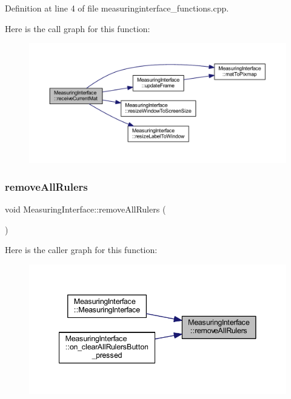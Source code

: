 Definition at line 4 of file measuringinterface\+\_\+functions.\+cpp.

Here is the call graph for this function\+:
\nopagebreak
\begin{figure}[H]
\begin{center}
\leavevmode
\includegraphics[width=350pt]{classMeasuringInterface_a776a6aa345a738ee46e84c272fd35ce7_cgraph}
\end{center}
\end{figure}
\mbox{\label{classMeasuringInterface_afc88c0d8a1a77e188aa000e2efb1cc80}} 
\subsubsection{\texorpdfstring{removeAllRulers}{removeAllRulers}}
{\footnotesize\ttfamily void Measuring\+Interface\+::remove\+All\+Rulers (\begin{DoxyParamCaption}{ }\end{DoxyParamCaption})\hspace{0.3cm}{\ttfamily [signal]}}

Here is the caller graph for this function\+:
\nopagebreak
\begin{figure}[H]
\begin{center}
\leavevmode
\includegraphics[width=341pt]{classMeasuringInterface_afc88c0d8a1a77e188aa000e2efb1cc80_icgraph}
\end{center}
\end{figure}
\mbox{\label{classMeasuringInterface_afe9e0efd285c9239d38d2fa9b9d8ff43}} 
